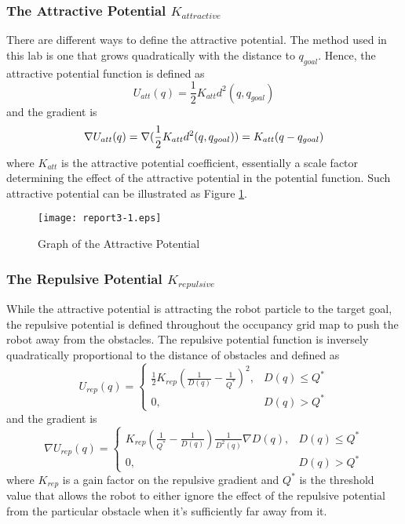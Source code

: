 \documentclass{article}
\begin{document}
\subsubsection{The Attractive Potential $K_{attractive}$}

There are different ways to define the attractive potential. The method used
in this lab is one that grows quadratically with the distance to $q_{goal}$.
Hence, the attractive potential function is defined as
\begin{equation}
  U_{att} (q) = \frac{1}{2} K_{att} d^2 (q, q_{goal})
\end{equation}
and the gradient is
\begin{equation}
  \nabla U_{att} (q) = \nabla ( \frac{1}{2} K_{att} d^2 (q, q_{goal})) \\
  = K_{att}  (q - q_{goal})
\end{equation}
where $K_{att}$ is the attractive potential coefficient, essentially a scale
factor determining the effect of the attractive potential in the potential
function. Such attractive potential can be illustrated as Figure
\ref{f:potential}. \begin{figure}[h]
  \texttt{[image: report3-1.eps]} \label{f:potential}
  \caption{Graph of the Attractive Potential}
\end{figure}

\subsubsection{The Repulsive Potential $K_{repulsive}$}

While the attractive potential is attracting the robot particle to the target
goal, the repulsive potential is defined throughout the occupancy grid map to
push the robot away from the obstacles. The repulsive potential function is
inversely quadratically proportional to the distance of obstacles and defined
as
\begin{equation}
  U_{rep} (q) = \left\{ \begin{array}{ll}
    \frac{1}{2} K_{rep}  ( \frac{1}{D (q)} - \frac{1}{Q^{\ast}})^2, & D (q)
    \leq Q^{\ast}\\
    0, & D (q) > Q^{\ast}
  \end{array} \right.
\end{equation}
and the gradient is
\begin{equation}
  \nabla U_{rep} (q) = \left\{ \begin{array}{ll}
    K_{rep}  ( \frac{1}{Q^{\ast}} - \frac{1}{D (q)})  \frac{1}{D^2 (q)} \nabla
    D (q), & D (q) \leq Q^{\ast}\\
    0, & D (q) > Q^{\ast}
  \end{array} \right.
\end{equation}
where $K_{rep}$ is a gain factor on the repulsive gradient and $Q^{\ast}$ is
the threshold value that allows the robot to either ignore the effect of the
repulsive potential from the particular obstacle when it's sufficiently far
away from it.
\end{document}
